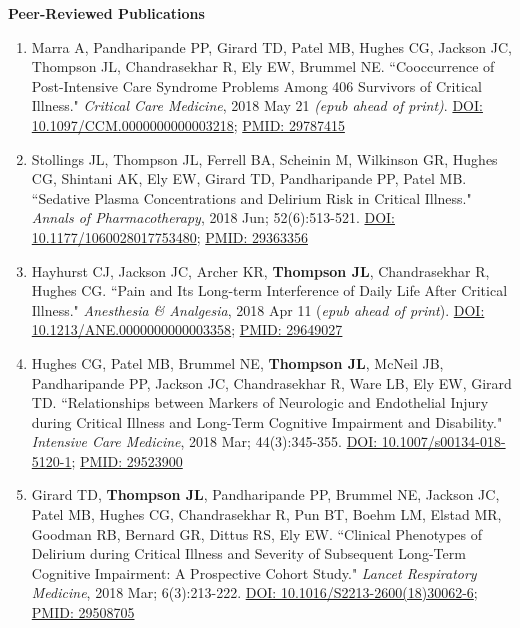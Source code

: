 \documentclass[5pt]{article}
\begin{document}
\noindent \textbf{Peer-Reviewed Publications}
\begin{enumerate}
\item Marra A, Pandharipande PP, Girard TD, Patel MB, Hughes CG, Jackson JC, Thompson JL, Chandrasekhar R, Ely EW, Brummel NE. ``Cooccurrence of Post-Intensive Care Syndrome Problems Among 406 Survivors of Critical Illness." \emph{Critical Care Medicine}, 2018 May 21 \emph{(epub ahead of print)}. \href{https://doi.org/10.1097/CCM.0000000000003218}{DOI: 10.1097/CCM.0000000000003218}; \href{https://www.ncbi.nlm.nih.gov/pubmed/29787415}{PMID: 29787415}
\item Stollings JL, Thompson JL, Ferrell BA, Scheinin M, Wilkinson GR, Hughes CG, Shintani AK, Ely EW, Girard TD, Pandharipande PP, Patel MB. ``Sedative Plasma Concentrations and Delirium Risk in Critical Illness." \emph{Annals of Pharmacotherapy}, 2018 Jun; 52(6):513-521. \href{https://doi.org/10.1177/1060028017753480}{DOI: 10.1177/1060028017753480}; \href{https://www.ncbi.nlm.nih.gov/pubmed/29363356}{PMID: 29363356}
\item Hayhurst CJ, Jackson JC, Archer KR, \textbf{Thompson JL}, Chandrasekhar R, Hughes CG. ``Pain and Its Long-term Interference of Daily Life After Critical Illness." \emph{Anesthesia \& Analgesia}, 2018 Apr 11 (\emph{epub ahead of print}). \href{https://doi.org/10.1213/ANE.0000000000003358}{DOI: 10.1213/ANE.0000000000003358}; \href{https://www.ncbi.nlm.nih.gov/pubmed/29649027}{PMID: 29649027}
\item Hughes CG, Patel MB, Brummel NE, \textbf{Thompson JL}, McNeil JB, Pandharipande PP, Jackson JC, Chandrasekhar R, Ware LB, Ely EW, Girard TD. ``Relationships between Markers of Neurologic and Endothelial Injury during Critical Illness and Long-Term Cognitive Impairment and Disability." \emph{Intensive Care Medicine}, 2018 Mar; 44(3):345-355. \href{https://doi.org/10.1007/s00134-018-5120-1}{DOI: 10.1007/s00134-018-5120-1}; \href{https://www.ncbi.nlm.nih.gov/pubmed/29523900}{PMID: 29523900}
\item Girard TD, \textbf{Thompson JL}, Pandharipande PP, Brummel NE, Jackson JC, Patel MB, Hughes CG, Chandrasekhar R, Pun BT, Boehm LM, Elstad MR, Goodman RB, Bernard GR, Dittus RS, Ely EW. ``Clinical Phenotypes of Delirium during Critical Illness and Severity of Subsequent Long-Term Cognitive Impairment: A Prospective Cohort Study." \emph{Lancet Respiratory Medicine}, 2018 Mar; 6(3):213-222. \href{https://doi.org/10.1016/S2213-2600(18)30062-6}{DOI: 10.1016/S2213-2600(18)30062-6}; \href{https://www.ncbi.nlm.nih.gov/pubmed/29508705}{PMID: 29508705}

\end{enumerate}
\end{document}
